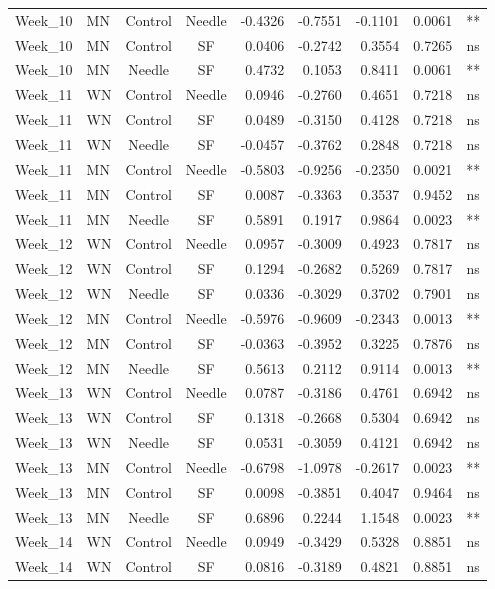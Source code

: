 \documentclass[
  12pt,
  letterpaper,
]{article}
\begin{document}
\begin{longtable}{llccrrrlc}
Week\_10 & MN & Control & Needle & -0.4326 & -0.7551 & -0.1101 & 0.0061 & ** \\ 
Week\_10 & MN & Control & SF & 0.0406 & -0.2742 & 0.3554 & 0.7265 & ns \\ 
Week\_10 & MN & Needle & SF & 0.4732 & 0.1053 & 0.8411 & 0.0061 & ** \\ 
Week\_11 & WN & Control & Needle & 0.0946 & -0.2760 & 0.4651 & 0.7218 & ns \\ 
Week\_11 & WN & Control & SF & 0.0489 & -0.3150 & 0.4128 & 0.7218 & ns \\ 
Week\_11 & WN & Needle & SF & -0.0457 & -0.3762 & 0.2848 & 0.7218 & ns \\ 
Week\_11 & MN & Control & Needle & -0.5803 & -0.9256 & -0.2350 & 0.0021 & ** \\ 
Week\_11 & MN & Control & SF & 0.0087 & -0.3363 & 0.3537 & 0.9452 & ns \\ 
Week\_11 & MN & Needle & SF & 0.5891 & 0.1917 & 0.9864 & 0.0023 & ** \\ 
Week\_12 & WN & Control & Needle & 0.0957 & -0.3009 & 0.4923 & 0.7817 & ns \\ 
Week\_12 & WN & Control & SF & 0.1294 & -0.2682 & 0.5269 & 0.7817 & ns \\ 
Week\_12 & WN & Needle & SF & 0.0336 & -0.3029 & 0.3702 & 0.7901 & ns \\ 
Week\_12 & MN & Control & Needle & -0.5976 & -0.9609 & -0.2343 & 0.0013 & ** \\ 
Week\_12 & MN & Control & SF & -0.0363 & -0.3952 & 0.3225 & 0.7876 & ns \\ 
Week\_12 & MN & Needle & SF & 0.5613 & 0.2112 & 0.9114 & 0.0013 & ** \\ 
Week\_13 & WN & Control & Needle & 0.0787 & -0.3186 & 0.4761 & 0.6942 & ns \\ 
Week\_13 & WN & Control & SF & 0.1318 & -0.2668 & 0.5304 & 0.6942 & ns \\ 
Week\_13 & WN & Needle & SF & 0.0531 & -0.3059 & 0.4121 & 0.6942 & ns \\ 
Week\_13 & MN & Control & Needle & -0.6798 & -1.0978 & -0.2617 & 0.0023 & ** \\ 
Week\_13 & MN & Control & SF & 0.0098 & -0.3851 & 0.4047 & 0.9464 & ns \\ 
Week\_13 & MN & Needle & SF & 0.6896 & 0.2244 & 1.1548 & 0.0023 & ** \\ 
Week\_14 & WN & Control & Needle & 0.0949 & -0.3429 & 0.5328 & 0.8851 & ns \\ 
Week\_14 & WN & Control & SF & 0.0816 & -0.3189 & 0.4821 & 0.8851 & ns \\ 

\end{longtable}
\end{document}
